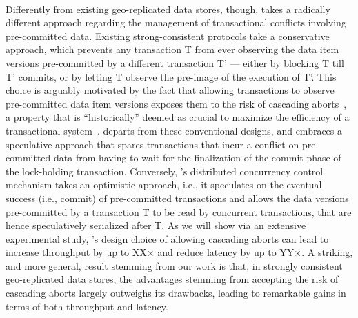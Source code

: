 ~\\

Differently from existing geo-replicated data stores, though, \specula takes a radically different approach regarding the management of transactional conflicts involving pre-committed data. Existing strong-consistent protocols take a conservative approach, which prevents any transaction T from ever observing the data item versions pre-committed by a different transaction T' --- either by blocking T till T' commits, or by letting T observe the pre-image of the execution of T'. This choice is arguably motivated by the fact that allowing transactions to observe pre-committed data item versions exposes them to the risk of cascading aborts~\cite{xxx}, a property that is ``historically'' deemed as crucial to maximize the efficiency of a transactional system~\cite{textbooks-on-db}. \specula departs from these conventional designs, and embraces a speculative approach that spares transactions that incur a conflict on pre-committed data from having to wait for the finalization of the commit phase of the lock-holding transaction. Conversely, \specula's distributed concurrency control mechanism takes an optimistic approach, i.e., it speculates on the eventual success (i.e., commit) of pre-committed transactions and allows the data versions pre-committed by a transaction T to be read by concurrent transactions, that are hence speculatively serialized after T. As we will show via an extensive experimental study, \specula's design choice of allowing cascading aborts can lead to increase throughput by up to XX$\times$ and reduce latency by up to YY$\times$. A striking, and more general, result stemming from our work is that, in strongly consistent geo-replicated data stores, the advantages stemming from accepting the risk of cascading aborts largely outweighs its drawbacks, leading to remarkable gains in terms of both throughput and latency.

